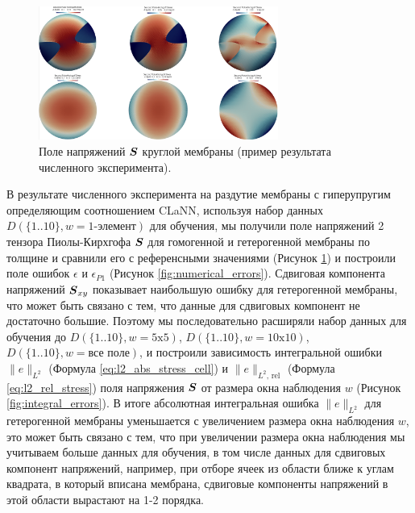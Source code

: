   \begin{figure}[H]
    \centering
    \includegraphics[width=0.7\textwidth]{img/Numerical/ref_stress.png}
    \caption{Поле напряжений $\boldsymbol{S}$ круглой мембраны (пример результата численного эксперимента).}
    \label{fig:numerical_experiment}
  \end{figure}
  
  В результате численного эксперимента на раздутие мембраны с гиперупругим определяющим соотношением CLaNN,
  используя набор данных $D (\{1..10\}, w=\text{1-элемент})$ для обучения, мы получили поле напряжений 2 тензора Пиолы-Кирхгофа 
  $\boldsymbol{S}$ для гомогенной и гетерогенной мембраны по толщине и сравнили его
  с референсными значениями (Рисунок \ref{fig:numerical_experiment}) и построили поле ошибок $\epsilon$ и $\epsilon_{P1}$ (Рисунок \ref{fig:numerical_errors}).
  Сдвиговая компонента напряжений $\boldsymbol{S}_{xy}$ показывает наибольшую ошибку для гетерогенной мембраны, 
  что может быть связано с тем, что данные для сдвиговых компонент не достаточно большие. Поэтому мы последовательно 
  расширяли набор данных для обучения до $D (\{1..10\}, w=\text{5x5})$, $D (\{1..10\}, w=\text{10x10})$, $D (\{1..10\}, w=\text{все поле})$, 
  и построили зависимость интегральной ошибки $\|e\|_{L^2}$ (Формула \eqref{eq:l2_abs_stress_cell}) и $\|e\|_{L^2,\,\mathrm{rel}}$ (Формула \eqref{eq:l2_rel_stress}) 
  поля напряжения $\boldsymbol{S}$ от размера окна наблюдения $w$ (Рисунок \ref{fig:integral_errors}). 
  В итоге абсолютная интегральная ошибка $\|e\|_{L^2}$  для гетерогенной мембраны уменьшается с увеличением размера окна наблюдения $w$, 
  это может быть связано с тем, что при увеличении размера окна наблюдения мы учитываем больше данных для обучения, в том числе данных 
  для сдвиговых компонент напряжений, например, при отборе ячеек из области ближе к углам квадрата, в который вписана мембрана, 
  сдвиговые компоненты напряжений в этой области вырастают на 1-2 порядка.
  
